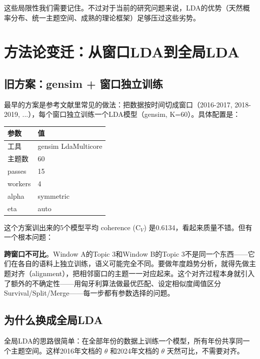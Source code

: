 \documentclass[12pt,a4paper]{ctexart}
\begin{document}
这些局限性我们需要记住。不过对于当前的研究问题来说，LDA的优势（天然概率分布、统一主题空间、成熟的理论框架）足够压过这些劣势。


\section{方法论变迁：从窗口LDA到全局LDA}
\label{sec:evolution}

\subsection{旧方案：gensim + 窗口独立训练}

最早的方案是参考文献里常见的做法：把数据按时间切成窗口（2016-2017, 2018-2019, ...），每个窗口独立训练一个LDA模型（gensim, K=60）。具体配置是：

\begin{table}[h]
\centering
\small
\begin{tabular}{ll}
\toprule
参数 & 值 \\
\midrule
工具 & gensim LdaMulticore \\
主题数 & 60 \\
passes & 15 \\
workers & 4 \\
alpha & symmetric \\
eta & auto \\
\bottomrule
\end{tabular}
\end{table}

这个方案训出来的5个模型平均 coherence (C$_V$) 是0.6134，看起来质量不错。但有一个根本问题：

\textbf{跨窗口不可比}。Window A的Topic 3和Window B的Topic 3不是同一个东西——它们在各自的语料上独立训练，语义可能完全不同。要做年度趋势分析，就得先做主题对齐（alignment），把相邻窗口的主题一一对应起来。这个对齐过程本身就引入了额外的不确定性——用匈牙利算法做最优匹配、设定相似度阈值区分Survival/Split/Merge——每一步都有参数选择的问题。

\subsection{为什么换成全局LDA}

全局LDA的思路很简单：在全部年份的数据上训练一个模型，所有年份共享同一个主题空间。这样2016年文档的 $\theta$ 和2024年文档的 $\theta$ 天然可比，不需要对齐。
\end{document}
